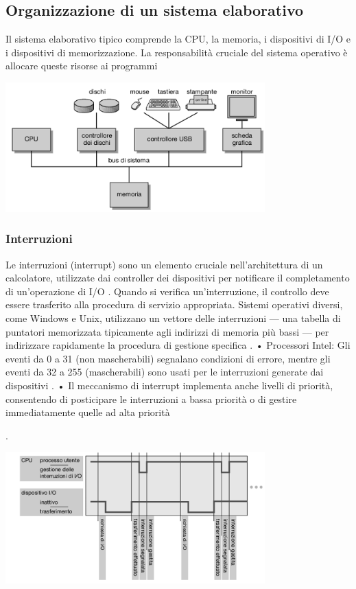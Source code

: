 \documentclass[12pt,a4paper, openany]{book}
\begin{document}
\begin{small}
		\subsection{Organizzazione di un sistema elaborativo} Il sistema elaborativo tipico comprende la CPU, la memoria, i dispositivi di I/O e i dispositivi di memorizzazione. La responsabilità cruciale del sistema operativo è allocare queste risorse ai programmi
		\newline
		
		\includegraphics[width=10cm, center]{img/1.1.2.1}
		
		\subsubsection{Interruzioni} Le interruzioni (interrupt) sono un elemento cruciale nell'architettura di un calcolatore, utilizzate dai controller dei dispositivi per notificare il completamento di un'operazione di I/O
		. Quando si verifica un'interruzione, il controllo deve essere trasferito alla procedura di servizio appropriata. Sistemi operativi diversi, come Windows e Unix, utilizzano un vettore delle interruzioni — una tabella di puntatori memorizzata tipicamente agli indirizzi di memoria più bassi — per indirizzare rapidamente la procedura di gestione specifica
		.\newline
		• Processori Intel: Gli eventi da 0 a 31 (non mascherabili) segnalano condizioni di errore, mentre gli eventi da 32 a 255 (mascherabili) sono usati per le interruzioni generate dai dispositivi
		.\newline
		• Il meccanismo di interrupt implementa anche livelli di priorità, consentendo di posticipare le interruzioni a bassa priorità o di gestire immediatamente quelle ad alta priorità
		
		.
		
		\includegraphics[width=10cm, center]{img/1.1.2.2}		
		

\end{small}
\end{document}
